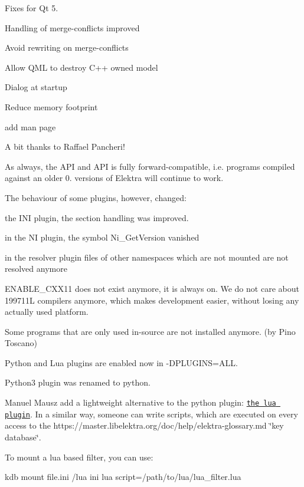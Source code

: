 \begin{DoxyItemize}
\item Fixes for Qt 5.
\item Handling of merge-\/conflicts improved
\item Avoid rewriting on merge-\/conflicts
\item Allow Q\+ML to destroy C++ owned model
\item Dialog at startup
\item Reduce memory footprint
\item add man page
\end{DoxyItemize}

A bit thanks to Raffael Pancheri!

As always, the A\+PI and A\+PI is fully forward-\/compatible, i.\+e. programs compiled against an older 0. versions of Elektra will continue to work.

The behaviour of some plugins, however, changed\+:


\begin{DoxyItemize}
\item the I\+NI plugin, the section handling was improved.
\item in the NI plugin, the symbol Ni\+\_\+\+Get\+Version vanished
\item in the resolver plugin files of other namespaces which are not mounted are not resolved anymore
\end{DoxyItemize}

E\+N\+A\+B\+L\+E\+\_\+\+C\+X\+X11 does not exist anymore, it is always on. We do not care about 199711L compilers anymore, which makes development easier, without losing any actually used platform.

Some programs that are only used in-\/source are not installed anymore. (by Pino Toscano)

Python and Lua plugins are enabled now in {\ttfamily -\/\+D\+P\+L\+U\+G\+I\+NS=A\+LL}.

Python3 plugin was renamed to python.

Manuel Mausz add a lightweight alternative to the python plugin\+: \href{https://master.libelektra.org/src/plugins/lua/}{\tt the lua plugin}. In a similar way, someone can write scripts, which are executed on every access to the https\+://master.libelektra.\+org/doc/help/elektra-\/glossary.md \char`\"{}key database\char`\"{}.

To mount a lua based filter, you can use\+:


\begin{DoxyCode}
kdb mount file.ini /lua ini lua script=/path/to/lua/lua\_filter.lua
\end{DoxyCode}


